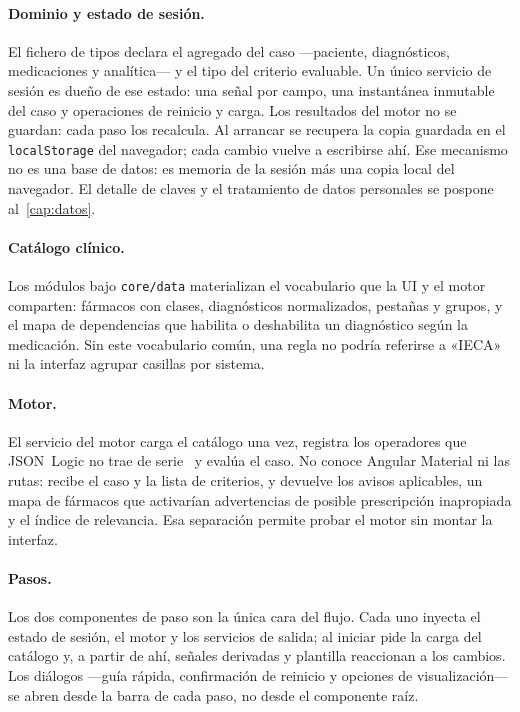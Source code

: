 \paragraph{Dominio y estado de sesión.}
El fichero de tipos declara el agregado del caso ---paciente,
diagnósticos, medicaciones y analítica--- y el tipo del criterio
evaluable. Un único servicio de sesión es dueño de ese estado: una
señal por campo, una instantánea inmutable del caso y operaciones de
reinicio y carga. Los resultados del motor no se guardan: cada paso los
recalcula. Al arrancar se recupera la copia guardada en el
\texttt{localStorage} del navegador; cada cambio vuelve a escribirse
ahí. Ese mecanismo no es una base de datos: es memoria de la sesión más
una copia local del navegador. El detalle de claves y el tratamiento de
datos personales se pospone al~\cref{cap:datos}.

\paragraph{Catálogo clínico.}
Los módulos bajo \texttt{core/data} materializan el vocabulario que la
UI y el motor comparten: fármacos con clases, diagnósticos
normalizados, pestañas y grupos, y el mapa de dependencias que habilita
o deshabilita un diagnóstico según la medicación. Sin este vocabulario
común, una regla no podría referirse a «IECA» ni la interfaz agrupar
casillas por sistema.

\paragraph{Motor.}
El servicio del motor carga el catálogo una vez, registra los operadores
que JSON~Logic no trae de serie~\cite{jsonlogic} y evalúa el caso. No
conoce Angular Material ni las rutas: recibe el caso y la lista de
criterios, y devuelve los avisos aplicables, un mapa de fármacos que
activarían advertencias de posible prescripción inapropiada y el índice
de relevancia. Esa separación permite probar el motor sin montar la
interfaz.

\paragraph{Pasos.}
Los dos componentes de paso son la única cara del flujo. Cada uno
inyecta el estado de sesión, el motor y los servicios de salida; al
iniciar pide la carga del catálogo y, a partir de ahí, señales
derivadas y plantilla reaccionan a los cambios. Los diálogos ---guía
rápida, confirmación de reinicio y opciones de visualización--- se
abren desde la barra de cada paso, no desde el componente raíz.

